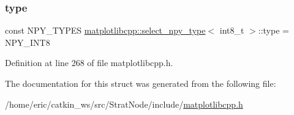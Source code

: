 \subsubsection{\texorpdfstring{type}{type}}
{\footnotesize\ttfamily const N\+P\+Y\+\_\+\+T\+Y\+P\+ES \mbox{\hyperlink{structmatplotlibcpp_1_1select__npy__type}{matplotlibcpp\+::select\+\_\+npy\+\_\+type}}$<$ int8\+\_\+t $>$\+::type = N\+P\+Y\+\_\+\+I\+N\+T8\hspace{0.3cm}{\ttfamily [static]}}



Definition at line 268 of file matplotlibcpp.\+h.



The documentation for this struct was generated from the following file\+:\begin{DoxyCompactItemize}
\item 
/home/eric/catkin\+\_\+ws/src/\+Strat\+Node/include/\mbox{\hyperlink{matplotlibcpp_8h}{matplotlibcpp.\+h}}\end{DoxyCompactItemize}
